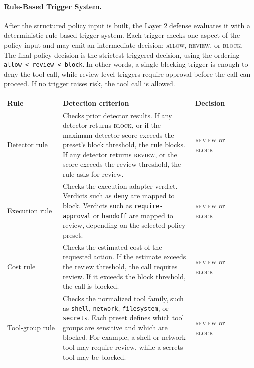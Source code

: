\documentclass{article}
\begin{document}
\paragraph{Rule-Based Trigger System.}
After the structured policy input is built, the Layer 2 defense evaluates it
with a deterministic rule-based trigger system. Each trigger checks one aspect
of the policy input and may emit an intermediate decision:
\textsc{allow}, \textsc{review}, or \textsc{block}. The final policy decision is
the strictest triggered decision, using the ordering
\texttt{allow < review < block}. In other words, a single blocking trigger is
enough to deny the tool call, while review-level triggers require approval before
the call can proceed. If no trigger raises risk, the tool call is allowed.

\begin{table}[H]
\centering
\small
\begin{tabular}{p{0.22\linewidth} p{0.53\linewidth} p{0.17\linewidth}}
\hline
\textbf{Rule} & \textbf{Detection criterion} & \textbf{Decision} \\
\hline

Detector rule &
Checks prior detector results. If any detector returns \textsc{block}, or if the
maximum detector score exceeds the preset's block threshold, the rule blocks.
If any detector returns \textsc{review}, or the score exceeds the review
threshold, the rule asks for review. &
\textsc{review} or \textsc{block} \\

Execution rule &
Checks the execution adapter verdict. Verdicts such as \texttt{deny} are mapped
to block. Verdicts such as \texttt{require-approval} or \texttt{handoff} are
mapped to review, depending on the selected policy preset. &
\textsc{review} or \textsc{block} \\

Cost rule &
Checks the estimated cost of the requested action. If the estimate exceeds the
review threshold, the call requires review. If it exceeds the block threshold,
the call is blocked. &
\textsc{review} or \textsc{block} \\

Tool-group rule &
Checks the normalized tool family, such as \texttt{shell}, \texttt{network},
\texttt{filesystem}, or \texttt{secrets}. Each preset defines which tool groups
are sensitive and which are blocked. For example, a shell or network tool may
require review, while a secrets tool may be blocked. &
\textsc{review} or \textsc{block} \\


\end{tabular}
\end{table}
\end{document}
